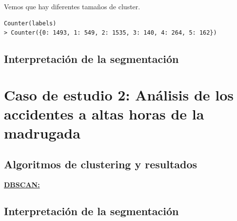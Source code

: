 \documentclass[oneside]{book}
\begin{document}
Vemos que hay diferentes tamaños de cluster.

\begin{verbatim}
Counter(labels)
> Counter({0: 1493, 1: 549, 2: 1535, 3: 140, 4: 264, 5: 162})
\end{verbatim}

\subsection{Interpretación de la
  segmentación} \label{sec:interpretacion1}

\section{Caso de estudio 2: Análisis de los accidentes a altas horas de la madrugada}

\subsection{Algoritmos de clustering y resultados}

\href{https://scikit-learn.org/stable/modules/generated/sklearn.cluster.DBSCAN.html}{\textbf{DBSCAN:}}

\subsection{Interpretación de la segmentación}
\end{document}
